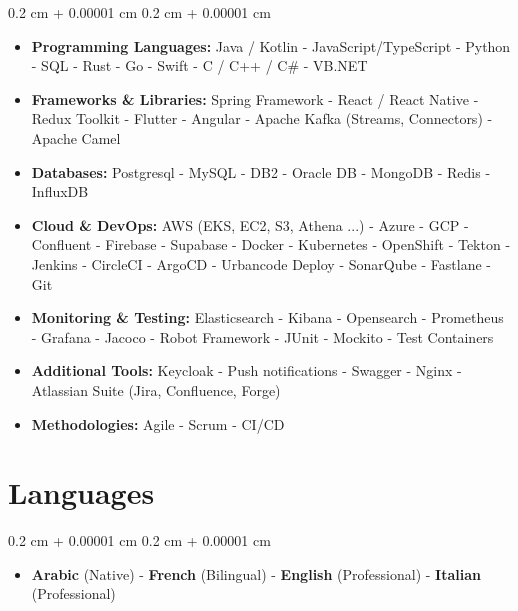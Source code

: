 \documentclass[10pt, a4paper]{article}
\newenvironment{highlightsforbulletentries}{
    \begin{itemize}[
        topsep=0.10 cm,
        parsep=0.10 cm,
        partopsep=0pt,
        itemsep=0pt,
        leftmargin=10pt
    ]
}{
    \end{itemize}
} %
\newenvironment{onecolentry}{
    \begin{adjustwidth}{
        0.2 cm + 0.00001 cm
    }{
        0.2 cm + 0.00001 cm
    }
}{
    \end{adjustwidth}
} %
\begin{document}
    \begin{onecolentry}
        \begin{highlightsforbulletentries}


        \item \textbf{Programming Languages:} Java / Kotlin - JavaScript/TypeScript - Python - SQL - Rust - Go - Swift - C / C++ / C\# - VB.NET

        \item \textbf{Frameworks \& Libraries:} Spring Framework - React / React Native - Redux Toolkit - Flutter - Angular - Apache Kafka (Streams, Connectors) - Apache Camel

        \item \textbf{Databases:} Postgresql - MySQL - DB2 - Oracle DB - MongoDB - Redis - InfluxDB

        \item \textbf{Cloud \& DevOps:} AWS (EKS, EC2, S3, Athena ...) - Azure - GCP - Confluent - Firebase - Supabase - Docker - Kubernetes - OpenShift - Tekton - Jenkins - CircleCI - ArgoCD - Urbancode Deploy - SonarQube - Fastlane - Git

        \item \textbf{Monitoring \& Testing:} Elasticsearch - Kibana - Opensearch - Prometheus - Grafana - Jacoco - Robot Framework - JUnit - Mockito - Test Containers

        \item \textbf{Additional Tools:} Keycloak - Push notifications - Swagger - Nginx - Atlassian Suite (Jira, Confluence, Forge)

        \item \textbf{Methodologies:} Agile - Scrum - CI/CD


        \end{highlightsforbulletentries}
    \end{onecolentry}

    \section{Languages}

    \begin{onecolentry}
        \begin{highlightsforbulletentries}


        \item \textbf{Arabic} (Native) - \textbf{French} (Bilingual) - \textbf{English} (Professional) - \textbf{Italian} (Professional)


        \end{highlightsforbulletentries}
    \end{onecolentry}
\end{document}
